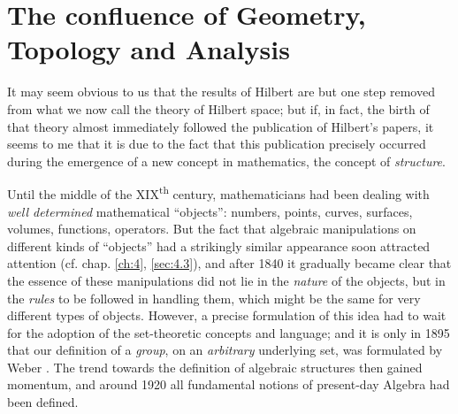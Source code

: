 \documentclass[12pt,a4paper,leqno,twoside]{extbook}
\newcommand{\supth}{\texorpdfstring{\textsuperscript{th}}{th}}
\begin{document}
\section{The confluence of Geometry, Topology and Analysis}
\label{sec:5.3}

It may seem obvious to us that the results of Hilbert are but one step removed from what we now call the theory of Hilbert space; but if, in fact, the birth of that theory almost immediately followed the publication of Hilbert's papers, it seems to me that it is due to the fact that this publication precisely occurred during the emergence of a new concept in mathematics, the concept of \emph{structure}.

Until the middle of the XIX\supth{} century, mathematicians had been dealing with \emph{well determined} mathematical ``objects'': numbers, points, curves, surfaces, volumes, functions, operators. But the fact that algebraic manipulations on different kinds of ``objects'' had a strikingly similar appearance soon attracted attention (cf. chap. \ref{ch:4}, \ref{sec:4.3}), and after 1840 it gradually became clear that the essence of these manipulations did not lie in the \emph{nature} of the objects, but in the \emph{rules} to be followed in handling them, which might be the same for very different types of objects. However, a precise formulation of this idea had to wait for the adoption of the set-theoretic concepts and language; and it is only in 1895 that our definition of a \emph{group}, on an \emph{arbitrary} underlying set, was formulated by Weber \cite{225}. The trend towards the definition of algebraic structures then gained momentum, and around 1920 all fundamental notions of present-day Algebra had been defined.
\end{document}
